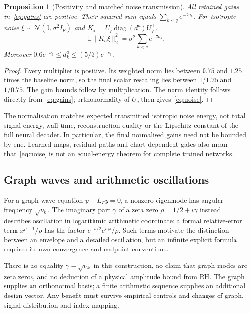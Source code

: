 \documentclass[10pt]{article}
\newtheorem{proposition}{Proposition}
\newcommand{\Lf}{L_F}
\newcommand{\Uq}{U_q}
\newcommand{\diag}{\operatorname{diag}}
\newcommand{\E}{\mathbb{E}}
\begin{document}
\begin{proposition}[Positivity and matched noise transmission]
All retained gains in~\eqref{eq:gains} are positive. Their squared sum
equals $\sum_{k<q}e^{-2\nu_k}$. For isotropic noise
$\xi\sim\mathcal N(0,\sigma^2 I_F)$ and
$K_a=\Uq\diag(d^a)\Uq^\top$,
\begin{equation}
 \E\|K_a\xi\|_2^2=\sigma^2\sum_{k<q}e^{-2\nu_k}.
 \label{eq:noise}
\end{equation}
Moreover $0.6e^{-\nu_k}\leq d_k^a\leq(5/3)e^{-\nu_k}$.
\end{proposition}
\begin{proof}
Every multiplier is positive. Its weighted norm lies between $0.75$
and $1.25$ times the baseline norm, so the final scalar rescaling lies
between $1/1.25$ and $1/0.75$. The gain bounds follow by multiplication.
The norm identity follows directly from~\eqref{eq:gains}; orthonormality
of $\Uq$ then gives~\eqref{eq:noise}.
\end{proof}

The normalisation matches expected transmitted isotropic noise energy,
not total signal energy, wall time, reconstruction quality or the
Lipschitz constant of the full neural decoder. In particular, the final
normalised gains need not be bounded by one. Learned maps, residual
paths and chart-dependent gates also mean that~\eqref{eq:noise} is not
an equal-energy theorem for complete trained networks.

\subsection{Graph waves and arithmetic oscillations}

For a graph wave equation $\ddot y+\Lf y=0$, a nonzero eigenmode has
angular frequency $\sqrt{\nu_k}$. The imaginary part $\gamma$ of a zeta
zero $\rho=1/2+i\gamma$ instead describes oscillation in logarithmic
arithmetic coordinate: a formal relative-error term
$x^{\rho-1}/\rho$ has the factor $e^{-s/2}e^{i\gamma s}/\rho$.
Such terms motivate the distinction between an envelope and a detailed
oscillation, but an infinite explicit formula requires its own
convergence and endpoint conventions.

There is no equality $\gamma=\sqrt{\nu_k}$ in this construction, no
claim that graph modes are zeta zeros, and no deduction of a physical
amplitude bound from RH. The graph supplies an orthonormal basis; a
finite arithmetic sequence supplies an additional design vector.
Any benefit must survive empirical controls and changes of graph,
signal distribution and index mapping.
\end{document}
